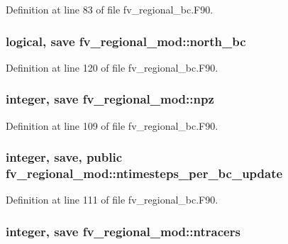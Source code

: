 Definition at line 83 of file fv\-\_\-regional\-\_\-bc.\-F90.

\subsubsection[{north\-\_\-bc}]{\setlength{\rightskip}{0pt plus 5cm}logical, save fv\-\_\-regional\-\_\-mod\-::north\-\_\-bc\hspace{0.3cm}{\ttfamily [private]}}\label{classfv__regional__mod_ab0d18e800d03af2331630c5d41f24647}


Definition at line 120 of file fv\-\_\-regional\-\_\-bc.\-F90.

\subsubsection[{npz}]{\setlength{\rightskip}{0pt plus 5cm}integer, save fv\-\_\-regional\-\_\-mod\-::npz\hspace{0.3cm}{\ttfamily [private]}}\label{classfv__regional__mod_a66c4d15d316eeb5577275a92f68c14c1}


Definition at line 109 of file fv\-\_\-regional\-\_\-bc.\-F90.

\subsubsection[{ntimesteps\-\_\-per\-\_\-bc\-\_\-update}]{\setlength{\rightskip}{0pt plus 5cm}integer, save, public fv\-\_\-regional\-\_\-mod\-::ntimesteps\-\_\-per\-\_\-bc\-\_\-update}\label{classfv__regional__mod_a4bc0673fc38c2310386939382a9c57ad}


Definition at line 111 of file fv\-\_\-regional\-\_\-bc.\-F90.

\subsubsection[{ntracers}]{\setlength{\rightskip}{0pt plus 5cm}integer, save fv\-\_\-regional\-\_\-mod\-::ntracers\hspace{0.3cm}{\ttfamily [private]}}\label{classfv__regional__mod_a59026f4c5f7fbd69bbaf1c53c9418817}


